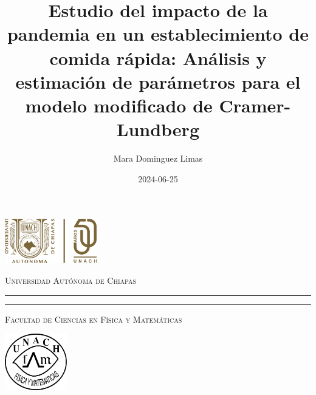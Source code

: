 \documentclass[
  us-letterpaper,
]{scrreprt}
\title{Estudio del impacto de la pandemia en un establecimiento de
comida rápida: Análisis y estimación de parámetros para el modelo
modificado de Cramer-Lundberg}
\author{Mara Dominguez Limas}
\date{2024-06-25}
\theoremstyle{plain}
\theoremstyle{plain}
\theoremstyle{definition}
\theoremstyle{remark}
\begin{document}
\begin{titlepage}
\hspace{-1.7cm} %
\begin{minipage}[t][0.03\textheight][c]{0.22\textwidth}
        \includegraphics[width=4.0cm]{FCFM-UNACH.png}
\end{minipage}\hspace{0.9cm}
\begin{minipage}[t][0.03\textheight][c]{0.69\textwidth}
\begin{center}
                \textsc{\huge Universidad Autónoma de Chiapas}\\[0.3cm]
                \hrule height 2.5pt
                \vspace{0.2cm}
                \hrule height1pt
                \vspace{0.3cm}
                \textsc{\Large Facultad de Ciencias en Física y Matemáticas}
\end{center}
\end{minipage}\hspace{0.2cm}
\begin{minipage}[t][0.03\textheight][c]{0.2\textwidth}
		\includegraphics[width=2.7cm]{logofcfm.png}
\end{minipage}\\
\begin{minipage}[t][0.93\textheight][c]{0.06\textwidth}
\vspace{60pt}
    \begin{center}
        \vrule width1pt height18cm
        \vspace{5mm}
        \vrule width2.5pt height18cm
        \vspace{5mm}
        \vrule width1pt height18cm
   \end{center}
\end{minipage}\hspace{1.3cm} 
\begin{minipage}[t][0.95\textheight][c]{0.76\textwidth}


\end{minipage}
\end{titlepage}
\end{document}
